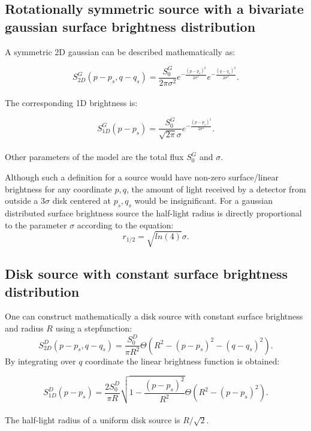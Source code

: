 \subsection{Rotationally symmetric source with a bivariate gaussian surface brightness distribution}

A symmetric 2D gaussian can be described mathematically as:

\begin{equation}
 S_{2D}^G(p-p_s, q-q_s) = \frac{S_0^G}{2 \pi \sigma^2} e^{-\frac{(p-p_s)^2}{2 \sigma^2}} e^{-\frac{(q-q_s)^2}{2 \sigma^2}}.
\end{equation}
\\
The corresponding 1D brightness is:

\begin{equation}
 S_{1D}^G(p-p_s) = \frac{S_0^G}{\sqrt{2 \pi} \sigma} e^{-\frac{(p-p_s)^2}{2 \sigma^2}}.
\end{equation}
\\
Other parameters of the model are the total flux $S_0^G$ and $\sigma$. 

Although such a definition for a source would have non-zero surface/linear brightness for any coordinate $p,q$, the amount of light received by a detector from outside a $3 \sigma$ disk centered at $p_s, q_s$ 
would be insignificant. For a gaussian distributed surface brightness source the half-light radius is directly proportional to the parameter $\sigma$ according to the equation:
\begin{equation}
r_{1/2} = \sqrt{ln(4)} \sigma.
\end{equation}

\subsection{Disk source with constant surface brightness distribution}

One can construct mathematically a disk source with constant surface brightness and radius $R$ using a stepfunction:
\begin{equation}
 S_{2D}^D(p-p_s, q-q_s) = \frac{S_0^D}{\pi R^2} \Theta \left( R^2 - \left( p-p_s \right)^2 - \left( q-q_s \right)^2 \right).
\end{equation}
By integrating over $q$ coordinate the linear brightness function is obtained:


\begin{equation}
 S_{1D}^D(p-p_s) = \frac{2 S_0^D}{\pi R}  \sqrt{1 - \frac{(p-p_s)^2}{R^2} }    \Theta \left( R^2 - \left( p-p_s \right)^2 \right).
\end{equation}
\\
The half-light radius of a uniform disk source is $R/\sqrt{2}$.


